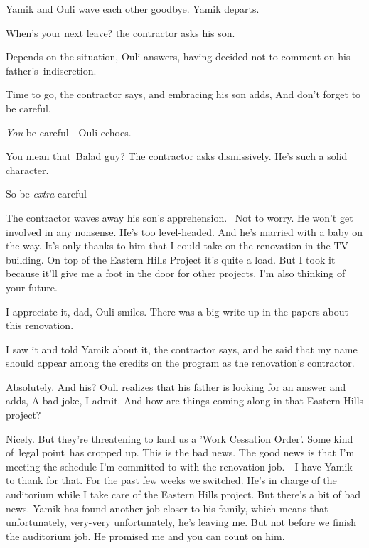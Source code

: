 \documentclass[letterpaper]{article}
\begin{document}
Yamik and Ouli wave each other goodbye. Yamik departs.

{\textquotedbl}When's your next leave?{\textquotedbl} the contractor asks his son. 

{\textquotedbl}Depends on the situation,{\textquotedbl} Ouli answers, having decided not to comment on his
father{}'s\ indiscretion.

{\textquotedbl}Time to go,{\textquotedbl} the contractor says, and embracing his son adds, {\textquotedbl}And don't
forget to be careful.{\textquotedbl}\ 

{\textquotedbl}\textit{You} be careful -{\textquotedbl} Ouli echoes. 

{\textquotedbl}You mean that\ Balad guy?{\textquotedbl} The contractor asks dismissively. {\textquotedbl}He's such a
solid character.{\textquotedbl} 

{\textquotedbl}So be \textit{extra} careful -{\textquotedbl} 

The contractor waves away his son's apprehension.~ {\textquotedbl}Not to worry. He won't get involved in any nonsense.
He's too level-headed. And he's married with a baby on the way. It's only thanks to him that I could take on the
renovation in the TV building. On top of the Eastern Hills Project it's quite a load. But I took it because it'll give
me a foot in the door for other projects. I'm also thinking of your future.{\textquotedbl} 

{\textquotedbl}I appreciate it, dad,{\textquotedbl} Ouli smiles. {\textquotedbl}There was a big write-up in the papers
about this renovation.{\textquotedbl} 

{\textquotedbl}I saw it and told Yamik about it,{\textquotedbl} the contractor says, {\textquotedbl}and he said that my
name should appear among the credits on the program as the renovation's contractor.{\textquotedbl} \ 

{\textquotedbl}Absolutely. And his?{\textquotedbl} Ouli realizes that his father is looking for an answer and adds,
{\textquotedbl}A bad joke, I admit. And how are things coming along in that Eastern Hills project?{\textquotedbl} 

{\textquotedbl}Nicely. But they're threatening to land us a 'Work Cessation Order'. Some kind of~legal point~has cropped
up. This is the bad news. The good news is that I'm meeting the schedule I'm committed to with the renovation job.\ \ I
have Yamik to thank for that. For the past few weeks we switched. He's in charge of the auditorium while I take care of
the Eastern Hills project. But there's a bit of bad news. Yamik has found another job closer to his family, which means
that unfortunately, very{}-very unfortunately, he's leaving me. But not before we finish the auditorium job. He
promised me and you can count on him.{\textquotedbl}
\end{document}
